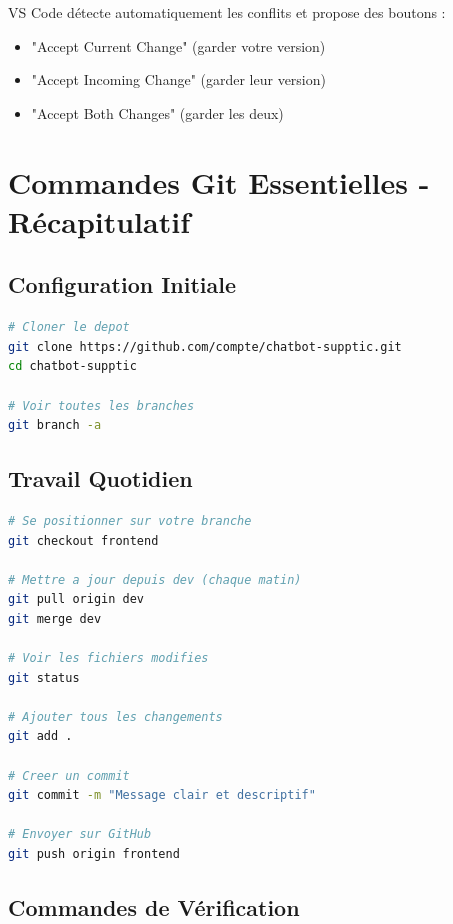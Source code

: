 \documentclass[11pt,a4paper]{article}
\begin{document}
\begin{astuce}
VS Code détecte automatiquement les conflits et propose des boutons :
\begin{itemize}
    \item "Accept Current Change" (garder votre version)
    \item "Accept Incoming Change" (garder leur version)
    \item "Accept Both Changes" (garder les deux)
\end{itemize}
\end{astuce}

\clearpage

\section{Commandes Git Essentielles - Récapitulatif}
\label{sec:commandes}

\subsection{Configuration Initiale}

\begin{lstlisting}[language=bash]
# Cloner le depot
git clone https://github.com/compte/chatbot-supptic.git
cd chatbot-supptic

# Voir toutes les branches
git branch -a
\end{lstlisting}

\subsection{Travail Quotidien}

\begin{lstlisting}[language=bash]
# Se positionner sur votre branche
git checkout frontend

# Mettre a jour depuis dev (chaque matin)
git pull origin dev
git merge dev

# Voir les fichiers modifies
git status

# Ajouter tous les changements
git add .

# Creer un commit
git commit -m "Message clair et descriptif"

# Envoyer sur GitHub
git push origin frontend
\end{lstlisting}

\subsection{Commandes de Vérification}
\end{document}
